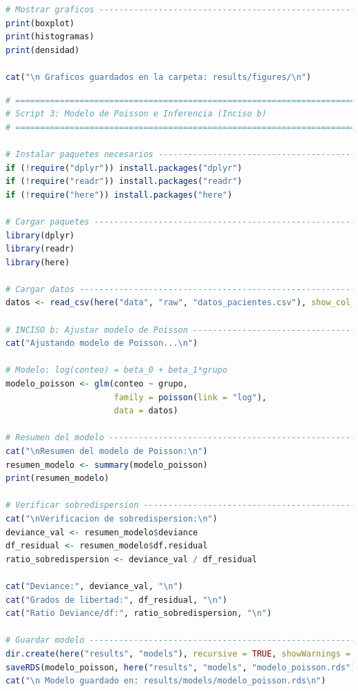 \begin{lstlisting}[language=R, caption={Script 2: Analisis Exploratorio - Comparacion Grafica (Inciso a).}, label={lst:script2}]
# Mostrar graficos ------------------------------------------------------------
print(boxplot)
print(histogramas)
print(densidad)

cat("\n Graficos guardados en la carpeta: results/figures/\n")
\end{lstlisting}

\clearpage %

\begin{lstlisting}[language=R, caption={Script 3: Modelo de Poisson e Inferencia (Inciso b).}, label={lst:script3}]
# =============================================================================
# Script 3: Modelo de Poisson e Inferencia (Inciso b)
# =============================================================================

# Instalar paquetes necesarios ------------------------------------------------
if (!require("dplyr")) install.packages("dplyr")
if (!require("readr")) install.packages("readr")
if (!require("here")) install.packages("here")

# Cargar paquetes -------------------------------------------------------------
library(dplyr)
library(readr)
library(here)

# Cargar datos ----------------------------------------------------------------
datos <- read_csv(here("data", "raw", "datos_pacientes.csv"), show_col_types = FALSE)

# INCISO b: Ajustar modelo de Poisson -----------------------------------------
cat("Ajustando modelo de Poisson...\n")

# Modelo: log(conteo) = beta_0 + beta_1*grupo
modelo_poisson <- glm(conteo ~ grupo, 
                      family = poisson(link = "log"),
                      data = datos)

# Resumen del modelo ----------------------------------------------------------
cat("\nResumen del modelo de Poisson:\n")
resumen_modelo <- summary(modelo_poisson)
print(resumen_modelo)

# Verificar sobredispersion ---------------------------------------------------
cat("\nVerificacion de sobredispersion:\n")
deviance_val <- resumen_modelo$deviance
df_residual <- resumen_modelo$df.residual
ratio_sobredispersion <- deviance_val / df_residual

cat("Deviance:", deviance_val, "\n")
cat("Grados de libertad:", df_residual, "\n")
cat("Ratio Deviance/df:", ratio_sobredispersion, "\n")

# Guardar modelo --------------------------------------------------------------
dir.create(here("results", "models"), recursive = TRUE, showWarnings = FALSE)
saveRDS(modelo_poisson, here("results", "models", "modelo_poisson.rds"))
cat("\n Modelo guardado en: results/models/modelo_poisson.rds\n")


\end{lstlisting}
